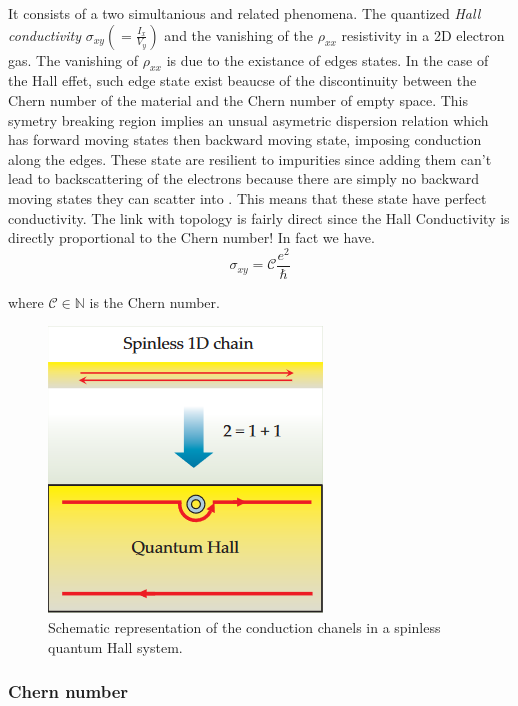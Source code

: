 It consists of a two simultanious and related phenomena. The quantized \textit{Hall conductivity} $\sigma_{xy}(=\frac{I_x}{V_y})$ and the vanishing of the $\rho_{xx}$ resistivity in a 2D electron gas. The vanishing of $\rho_{xx}$ is due to the existance of edges states.%
In the case of the Hall effet, such edge state exist beaucse of the discontinuity between the Chern number of the material and the Chern number of empty space. This symetry breaking region implies an unsual asymetric dispersion relation which has forward moving states then backward moving state, imposing conduction along the edges.\cite{kane_topological_2013} These state are resilient to impurities since adding them can't lead to backscattering of the electrons because there are simply no backward moving states they can scatter into \cite{qi_quantum_2010}. This means that these state have perfect conductivity.  The link with topology is fairly direct since the Hall Conductivity is directly proportional to the Chern number! In fact we have.
\begin{equation}
\sigma_{xy} = \mathcal{C}\frac{e^2}{\hbar}
\end{equation}

where $\mathcal{C} \in \mathbb{N}$ is the Chern number.

\begin{figure}[h!]
    \includegraphics[scale = 0.7]{sections/visuel/spinless.png}
    \caption{Schematic representation of the conduction chanels in a spinless quantum Hall system.\cite{qi_quantum_2010}}
    \label{spinless}
\end{figure}



\subsubsection{Chern number}

